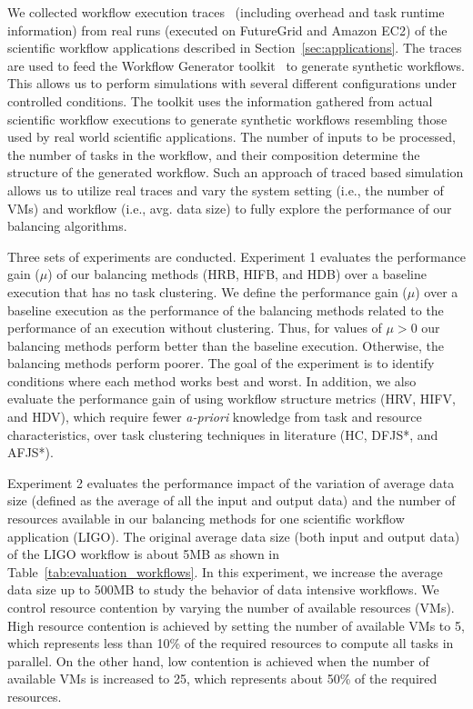 \documentclass[final,5p,times,twocolumn]{elsarticle}
\begin{document}
We collected workflow execution traces~\cite{Juve2013,Chen2011} (including overhead and task runtime information) from real runs (executed on FutureGrid and Amazon EC2) of the scientific workflow applications described in Section~\ref{sec:applications}. The traces are used to feed the Workflow Generator toolkit~\cite{FerreiradaSilva-eScience-2014} to generate synthetic workflows. This allows us to perform simulations with several different configurations under controlled conditions. The toolkit uses the information gathered from actual scientific workflow executions to generate synthetic workflows resembling those used by real world scientific applications. The number of inputs to be processed, the number of tasks in the workflow, and their composition determine the structure of the generated workflow. Such an approach of traced based simulation allows us to utilize real traces and vary the system setting (i.e., the number of VMs) and workflow (i.e., avg. data size) to fully explore the performance of our balancing algorithms. 

Three sets of experiments are conducted. Experiment 1 evaluates the performance gain ($\mu$) of our balancing methods (HRB, HIFB, and HDB) over a baseline execution that has no task clustering. We define the performance gain ($\mu$) over a baseline execution as the performance of the balancing methods related to the performance of an execution without clustering. Thus, for values of $\mu > 0$ our balancing methods perform better than the baseline execution. Otherwise, the balancing methods perform poorer. The goal of the experiment is to identify conditions where each method works best and worst. In addition, we also evaluate the performance gain of using workflow structure metrics (HRV, HIFV, and HDV), which require fewer \emph{a-priori} knowledge from task and resource characteristics, over task clustering techniques in literature (HC, DFJS*, and AFJS*).

Experiment 2 evaluates the performance impact of the variation of average data size (defined as the average of all the input and output data) and the number of resources available in our balancing methods for one scientific workflow application (LIGO). The original average data size (both input and output data) of the LIGO workflow is about 5MB as shown in Table~\ref{tab:evaluation_workflows}. In this experiment, we increase the average data size up to 500MB to study the behavior of data intensive workflows. We control resource contention by varying the number of available resources (VMs). High resource contention is achieved by setting the number of available VMs to 5, which represents less than 10\% of the required resources to compute all tasks in parallel. On the other hand, low contention is achieved when the number of available VMs is increased to 25, which represents about 50\% of the required resources.
\end{document}
